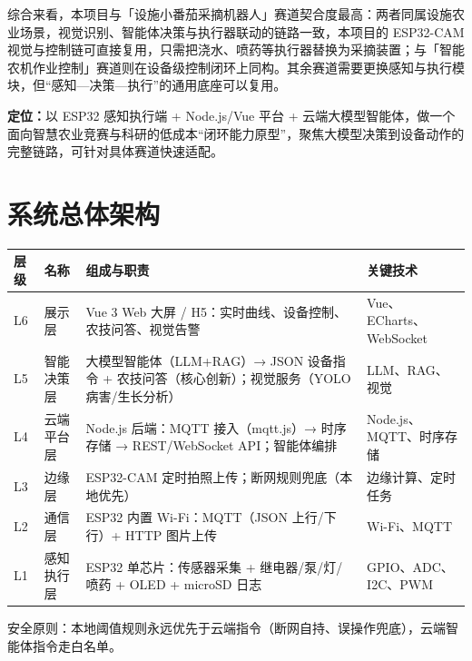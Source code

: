 \documentclass[11pt]{ctexart}
\begin{document}
综合来看，本项目与「设施小番茄采摘机器人」赛道契合度最高：两者同属设施农业场景，视觉识别、智能体决策与执行器联动的链路一致，本项目的 ESP32-CAM 视觉与控制链可直接复用，只需把浇水、喷药等执行器替换为采摘装置；与「智能农机作业控制」赛道则在设备级控制闭环上同构。其余赛道需要更换感知与执行模块，但“感知—决策—执行”的通用底座可以复用。

\textbf{定位：}以 ESP32 感知执行端 + Node.js/Vue 平台 + 云端大模型智能体，做一个面向智慧农业竞赛与科研的低成本“闭环能力原型”，聚焦大模型决策到设备动作的完整链路，可针对具体赛道快速适配。

\section{系统总体架构}
\begin{longtable}{p{1.2cm}p{2.2cm}p{8.8cm}p{3.0cm}}
  \toprule
  层级 & 名称 & 组成与职责 & 关键技术 \\
  \midrule
  L6 & 展示层 & Vue 3 Web 大屏 / H5：实时曲线、设备控制、农技问答、视觉告警 & Vue、ECharts、WebSocket \\
  L5 & 智能决策层 & 大模型智能体（LLM+RAG）→ JSON 设备指令 + 农技问答（核心创新）；视觉服务（YOLO 病害/生长分析） & LLM、RAG、视觉 \\
  L4 & 云端平台层 & Node.js 后端：MQTT 接入（mqtt.js）→ 时序存储 → REST/WebSocket API；智能体编排 & Node.js、MQTT、时序存储 \\
  L3 & 边缘层 & ESP32-CAM 定时拍照上传；断网规则兜底（本地优先） & 边缘计算、定时任务 \\
  L2 & 通信层 & ESP32 内置 Wi-Fi：MQTT（JSON 上行/下行）+ HTTP 图片上传 & Wi-Fi、MQTT \\
  L1 & 感知执行层 & ESP32 单芯片：传感器采集 + 继电器/泵/灯/喷药 + OLED + microSD 日志 & GPIO、ADC、I2C、PWM \\
  \bottomrule
\end{longtable}
安全原则：本地阈值规则永远优先于云端指令（断网自持、误操作兜底），云端智能体指令走白名单。
\end{document}
